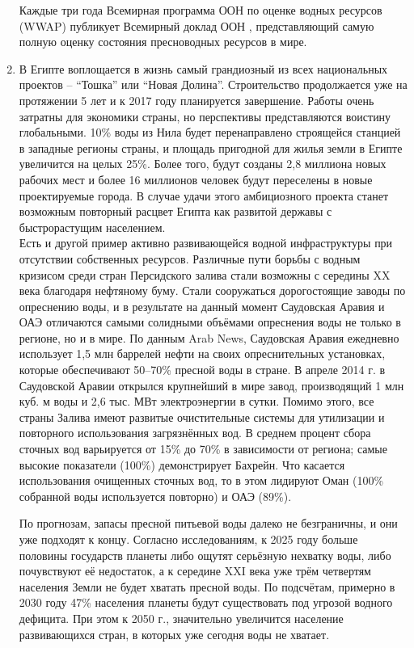 \begin{enumerate}
		  Каждые три года Всемирная программа ООН по оценке водных ресурсов (WWAP) публикует Всемирный доклад ООН \cite{litlink6}, представляющий самую полную оценку состояния пресноводных ресурсов в мире.
		  \item В Египте воплощается в жизнь самый грандиозный из всех национальных проектов – “Тошка” или “Новая Долина”. Строительство продолжается уже на протяжении 5 лет и к 2017 году планируется завершение. Работы очень затратны для экономики страны, но перспективы представляются воистину глобальными. 10\% воды из Нила будет перенаправлено строящейся станцией в западные регионы страны, и площадь пригодной для жилья земли в Египте увеличится на целых 25\%. Более того, будут созданы 2,8 миллиона новых рабочих мест и более 16 миллионов человек будут переселены в новые проектируемые города. В случае удачи этого амбициозного проекта станет возможным повторный расцвет Египта как развитой державы с быстрорастущим населением.\cite {litlink4} \\Есть и другой пример активно развивающейся водной инфраструктуры при отсутствии собственных ресурсов. Различные пути борьбы с водным кризисом среди стран Персидского залива стали возможны с середины XX века благодаря нефтяному буму. Стали сооружаться дорогостоящие заводы по опреснению воды, и в результате на данный момент Саудовская Аравия и ОАЭ отличаются самыми солидными объёмами опреснения воды не только в регионе, но и в мире. По данным Arab News, Саудовская Аравия ежедневно использует 1,5 млн баррелей нефти на своих опреснительных установках, которые обеспечивают 50–70\% пресной воды в стране. В апреле 2014 г. в Саудовской Аравии открылся крупнейший в мире завод, производящий 1 млн куб. м воды и 2,6 тыс. МВт электроэнергии в сутки. Помимо этого, все страны Залива имеют развитые очистительные системы для утилизации и повторного использования загрязнённых вод. В среднем процент сбора сточных вод варьируется от 15\% до 70\% в зависимости от региона; самые высокие показатели (100\%) демонстрирует Бахрейн. Что касается использования очищенных сточных вод, то в этом лидируют Оман (100\% собранной воды используется повторно) и ОАЭ (89\%)\cite {litlink3}.
		  
		  По прогнозам, запасы пресной питьевой воды далеко не безграничны, и они уже подходят к концу. Согласно исследованиям, к 2025 году больше половины государств планеты либо ощутят серьёзную нехватку воды, либо почувствуют её недостаток, а к середине XXI века уже трём четвертям населения Земли не будет хватать пресной воды. По подсчётам, примерно в 2030 году 47\% населения планеты будут существовать под угрозой водного дефицита. При этом к 2050 г., значительно увеличится население развивающихся стран, в которых уже сегодня воды не хватает.
		  

\end{enumerate}
